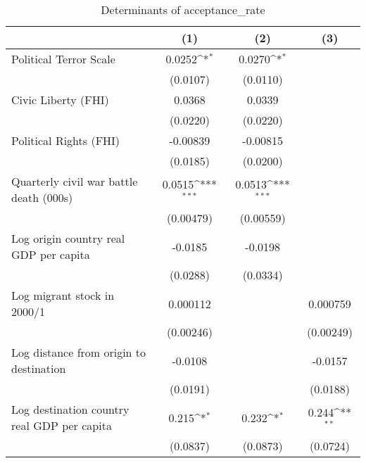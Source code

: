 \begin{table}[htbp]\centering
\def\sym#1{\ifmmode^{#1}\else\(^{#1}\)\fi}
\caption{Determinants of acceptance\_rate}
\begin{tabular}{l*{3}{c}}
\hline\hline
                    &\multicolumn{1}{c}{(1)}         &\multicolumn{1}{c}{(2)}         &\multicolumn{1}{c}{(3)}         \\
\hline
Political Terror Scale&      0.0252\sym{*}  &      0.0270\sym{*}  &                     \\
                    &    (0.0107)         &    (0.0110)         &                     \\
[1em]
Civic Liberty (FHI) &      0.0368         &      0.0339         &                     \\
                    &    (0.0220)         &    (0.0220)         &                     \\
[1em]
Political Rights (FHI)&    -0.00839         &    -0.00815         &                     \\
                    &    (0.0185)         &    (0.0200)         &                     \\
[1em]
Quarterly civil war battle death (000s)&      0.0515\sym{***}&      0.0513\sym{***}&                     \\
                    &   (0.00479)         &   (0.00559)         &                     \\
[1em]
Log origin country real GDP per capita&     -0.0185         &     -0.0198         &                     \\
                    &    (0.0288)         &    (0.0334)         &                     \\
[1em]
Log migrant stock in 2000/1&    0.000112         &                     &    0.000759         \\
                    &   (0.00246)         &                     &   (0.00249)         \\
[1em]
Log distance from origin to destination&     -0.0108         &                     &     -0.0157         \\
                    &    (0.0191)         &                     &    (0.0188)         \\
[1em]
Log destination country real GDP per capita&       0.215\sym{*}  &       0.232\sym{*}  &       0.244\sym{**} \\
                    &    (0.0837)         &    (0.0873)         &    (0.0724)         \\

\end{tabular}
\end{table}
